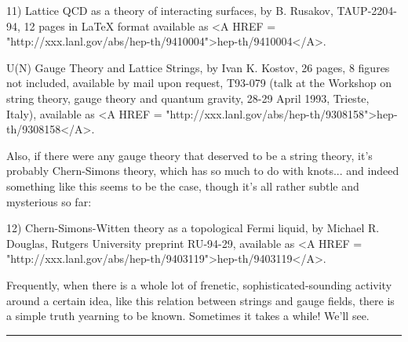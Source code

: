 11) Lattice QCD as a theory of interacting surfaces, by B. Rusakov,
TAUP-2204-94, 12 pages in LaTeX format available as <A HREF = "http://xxx.lanl.gov/abs/hep-th/9410004">hep-th/9410004</A>.

U(N) Gauge Theory and Lattice Strings, by Ivan K. Kostov, 26 pages, 8
figures not included, available by mail upon request, T93-079 (talk at
the Workshop on string theory, gauge theory and quantum gravity, 28-29
April 1993, Trieste, Italy), available as <A HREF = "http://xxx.lanl.gov/abs/hep-th/9308158">hep-th/9308158</A>.  

Also, if there were any gauge theory that deserved to be a string
theory, it's probably Chern-Simons theory, which has so much to do with
knots... and indeed something like this seems to be the case, though
it's all rather subtle and mysterious so far:

12) Chern-Simons-Witten theory as a topological Fermi liquid, by Michael
R. Douglas, Rutgers University preprint RU-94-29, available as
<A HREF = "http://xxx.lanl.gov/abs/hep-th/9403119">hep-th/9403119</A>. 

Frequently, when there is a whole lot of frenetic, sophisticated-sounding
activity around a certain idea, like this relation between strings and
gauge fields, there is a simple truth yearning to be known.  Sometimes
it takes a while!  We'll see.
\par\noindent\rule{\textwidth}{0.4pt}

